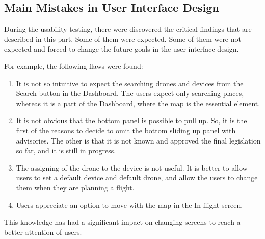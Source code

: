 \subsection{Main Mistakes in User Interface Design}\label{subsec:main-mistakes-in-ui-design}
During the usability testing, there were discovered the critical findings that are described in this part.
Some of them were expected.
Some of them were not expected and forced to change the future goals in the user interface design.

For example, the following flaws were found:
\begin{enumerate}
    \item It is not so intuitive to expect the searching drones and devices from the Search button in the Dashboard.
    The users expect only searching places, whereas it is a part of the Dashboard, where the map is the essential element.
    \item It is not obvious that the bottom panel is possible to pull up.
    So, it is the first of the reasons to decide to omit the bottom sliding up panel with advisories.
    The other is that it is not known and approved the final legislation so far, and it is still in progress.
    \item The assigning of the drone to the device is not useful.
    It is better to allow users to set a default device and default drone, and allow the users to change them when they are planning a flight.
    \item Users appreciate an option to move with the map in the In-flight screen.
\end{enumerate}

This knowledge has had a significant impact on changing screens to reach a better attention of users.
